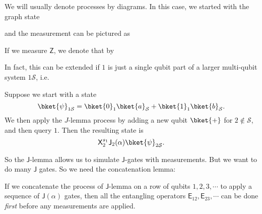 \documentclass[a4paper]{article}
\newcommand{\qE}{\mathsf{E}}
\newcommand{\qJ}{\mathsf{J}}
\newcommand{\qX}{\mathsf{X}}
\newcommand{\qZ}{\mathsf{Z}}
\begin{document}
We will usually denote processes by diagrams. In this case, we started with the graph state
\begin{center}
\end{center}
and the measurement can be pictured as
\begin{center}
\end{center}
If we measure $\qZ$, we denote that by
\begin{center}
\end{center}
In fact, this can be extended if $1$ is just a single qubit part of a larger multi-qubit system $1\mathcal{S}$, i.e.
\begin{lemma}
  Suppose we start with a state
  \[
    \bket{\psi}_{1\mathcal{S}} = \bket{0}_1\bket{a}_\mathcal{S} + \bket{1}_1 \bket{b}_\mathcal{S}.
  \]
  We then apply the $J$-lemma process by adding a new qubit $\bket{+}$ for $2 \not \in \mathcal{S}$, and then query $1$. Then the resulting state is
  \[
    \qX_2^{s_1}\qJ_2(\alpha) \bket{\psi}_{2\mathcal{S}}.
  \]
\end{lemma}
So the $\qJ$-lemma allows us to simulate $\qJ$-gates with measurements. But we want to do many $\qJ$ gates. So we need the concatenation lemma:
\begin{lemma}
  If we concatenate the process of $\qJ$-lemma on a row of qubits $1, 2, 3, \cdots$ to apply a sequence of $\qJ(\alpha)$ gates, then all the entangling operators $\qE_{12}, \qE_{23}, \cdots$ can be done \emph{first} before any measurements are applied.
\end{lemma}
\end{document}
